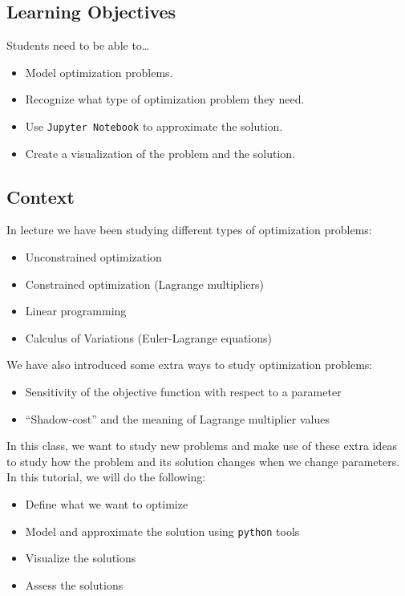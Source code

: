\subsection*{Learning Objectives}
	Students need to be able to\ldots
	\begin{itemize}
		\item Model optimization problems. \\[-20pt]
		\item Recognize what type of optimization problem they need.\\[-20pt]
		\item Use \texttt{Jupyter Notebook} to approximate the solution.\\[-20pt]
		\item Create a visualization of the problem and the solution.
	\end{itemize}

\subsection*{Context}
	
In lecture we have been studying different types of optimization problems:
\begin{itemize}
	\item Unconstrained optimization
	\item Constrained optimization (Lagrange multipliers)
	\item Linear programming
	\item Calculus of Variations (Euler-Lagrange equations)
\end{itemize}

We have also introduced some extra ways to study optimization problems:
\begin{itemize}
	\item Sensitivity of the objective function with respect to a parameter
	\item ``Shadow-cost'' and the meaning of Lagrange multiplier values
\end{itemize}

In this class, we want to study new problems and make use of these extra ideas to study how the problem and its solution changes when we change parameters. \\


In this tutorial, we will do the following:
\begin{itemize}
	\item Define what we want to optimize
	\item Model and approximate the solution using \texttt{python} tools
	\item Visualize the solutions
	\item Assess the solutions
\end{itemize}


